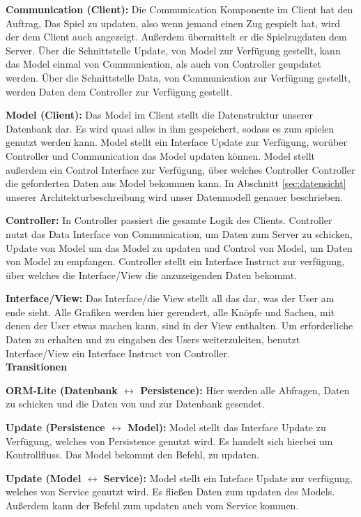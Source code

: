 \documentclass[fontsize=12pt,paper=a4,twoside]{scrartcl}
\begin{document}
\textbf{Communication (Client):}
Die Communication Komponente im Client hat den Auftrag, Das Spiel zu updaten, also wenn jemand einen Zug gespielt hat, wird der dem Client auch angezeigt. Außerdem übermittelt er die Spielzugdaten dem Server. Über die Schnittstelle Update, von Model zur Verfügung gestellt, kann das Model einmal von Communication, als auch von Controller geupdatet werden. Über die Schnittstelle Data, von Communication zur Verfügung gestellt, werden Daten dem Controller zur Verfügung gestellt.

\textbf{Model (Client):}
Das Model im Client stellt die Datenstruktur unserer Datenbank dar. Es wird quasi alles in ihm gespeichert, sodass es zum spielen genutzt werden kann. Model stellt ein Interface Update zur Verfügung, worüber Controller und Communication das Model updaten können. Model stellt außerdem ein Control Interface zur Verfügung, über welches Controller Controller die geforderten Daten aus Model bekommen kann. In Abschnitt \ref{sec:datensicht} unserer Architekturbeschreibung wird unser Datenmodell genauer beschrieben.

\textbf{Controller:}
In Controller passiert die gesamte Logik des Clients. Controller nutzt das Data Interface von Communication, um Daten zum Server zu schicken, Update von Model um das Model zu updaten und Control von Model, um Daten von Model zu empfangen. Controller stellt ein Interface Instruct zur verfügung, über welches die Interface/View die anzuzeigenden Daten bekommt. 

\textbf{Interface/View:}
Das Interface/die View stellt all das dar, was der User am ende sieht. Alle Grafiken werden hier gerendert, alle Knöpfe und Sachen, mit denen der User etwas machen kann, sind in der View enthalten. Um erforderliche Daten zu erhalten und zu eingaben des Users weiterzuleiten, benutzt Interface/View ein Interface Instruct von Controller. \\

\textbf{Transitionen}

\textbf{ORM-Lite (Datenbank $\leftrightarrow$ Persistence):}
Hier werden alle Abfragen, Daten zu schicken und die Daten von und zur Datenbank gesendet.

\textbf{Update (Persistence $\leftrightarrow$ Model):}
Model stellt das Interface Update zu Verfügung, welches von Persistence genutzt wird. Es handelt sich hierbei um Kontrollfluss. Das Model bekommt den Befehl, zu updaten. 

\textbf{Update (Model $\leftrightarrow$ Service):}
Model stellt ein Inteface Update zur verfügung, welches von Service genutzt wird. Es fließen Daten zum updaten des Models. Außerdem kann der Befehl zum updaten auch vom Service kommen.
\end{document}
